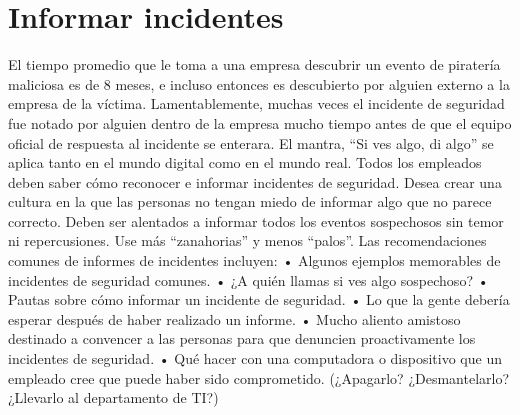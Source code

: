 \documentclass[
]{article}
\begin{document}
\hypertarget{informar-incidentes}{%
\section{Informar incidentes}\label{informar-incidentes}}

El tiempo promedio que le toma a una empresa descubrir un evento de piratería maliciosa es de 8 meses, e incluso entonces es descubierto por alguien externo a la empresa de la víctima. Lamentablemente, muchas veces el incidente de seguridad fue notado por alguien dentro de la empresa mucho tiempo antes de que el equipo oficial de respuesta al incidente se enterara. El mantra, ``Si ves algo, di algo'' se aplica tanto en el mundo digital como en el mundo real.
Todos los empleados deben saber cómo reconocer e informar incidentes de seguridad. Desea crear una cultura en la que las personas no tengan miedo de informar algo que no parece correcto. Deben ser alentados a informar todos los eventos sospechosos sin temor ni repercusiones. Use más ``zanahorias'' y menos ``palos''.
Las recomendaciones comunes de informes de incidentes incluyen:
• Algunos ejemplos memorables de incidentes de seguridad comunes.
• ¿A quién llamas si ves algo sospechoso?
• Pautas sobre cómo informar un incidente de seguridad.
• Lo que la gente debería esperar después de haber realizado un informe.
• Mucho aliento amistoso destinado a convencer a las personas para que denuncien proactivamente los incidentes de seguridad.
• Qué hacer con una computadora o dispositivo que un empleado cree que puede haber sido comprometido. (¿Apagarlo? ¿Desmantelarlo? ¿Llevarlo al departamento de TI?)
\end{document}
